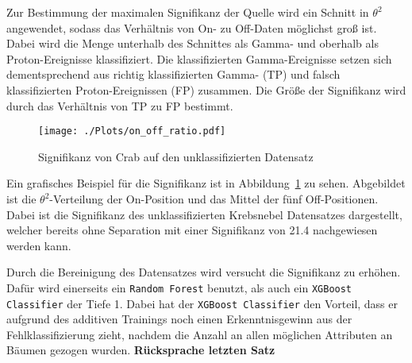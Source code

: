 Zur Bestimmung der maximalen Signifikanz der Quelle wird ein Schnitt in $\theta^{2}$ angewendet, sodass das Verhältnis von On- zu Off-Daten möglichst groß ist.
Dabei wird die Menge unterhalb des Schnittes als Gamma- und oberhalb als Proton-Ereignisse klassifiziert.
Die klassifizierten Gamma-Ereignisse setzen sich dementsprechend aus richtig klassifizierten Gamma- (TP) und falsch klassifizierten Proton-Ereignissen (FP) zusammen. 
Die Größe der Signifikanz wird durch das Verhältnis von TP zu FP bestimmt.
\begin{figure}[H]
  \centering
  \texttt{[image: ./Plots/on\_off\_ratio.pdf]}
  \caption{Signifikanz von Crab auf den unklassifizierten Datensatz}
  \label{fig:sig_crab}
\end{figure}
Ein grafisches Beispiel für die Signifikanz ist in Abbildung~\ref{fig:sig_crab} zu sehen. 
Abgebildet ist die $\theta^{2}$-Verteilung der On-Position und das Mittel der fünf Off-Positionen.
Dabei ist die Signifikanz des unklassifizierten Krebsnebel Datensatzes dargestellt, welcher bereits ohne Separation mit einer Signifikanz von \SI{21,4}{\sigma} nachgewiesen werden kann.

Durch die Bereinigung des Datensatzes wird versucht die Signifikanz zu erhöhen.
Dafür wird einerseits ein \texttt{Random Forest} benutzt, als auch ein \texttt{XGBoost Classifier} der Tiefe 1. 
Dabei hat der \texttt{XGBoost Classifier} den Vorteil, dass er aufgrund des additiven Trainings noch einen Erkenntnisgewinn aus der Fehlklassifizierung zieht, nachdem die Anzahl an allen möglichen Attributen an Bäumen gezogen wurden. \textbf{Rücksprache letzten Satz}


